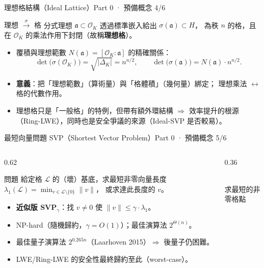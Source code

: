 \documentclass[aspectratio=169, 11pt]{beamer}
\newcommand{\OK}{\mathcal{O}_K}
\begin{document}
\begin{frame}{理想格結構（Ideal Lattice）}{Part 0 · 預備概念 4/6}
  \begin{block}{理想 $\xrightarrow{\ \sigma\ }$ 格}
    分式理想 $\mathfrak{a}\subset\OK$ 透過標準嵌入給出 $\sigma(\mathfrak{a})\subset H$，
    為秩 $n$ 的格，且在 $\OK$ 的乘法作用下封閉（故稱\textbf{理想格}）。
  \end{block}
  \begin{itemize}\small
    \item 覆積與理想範數 $N(\mathfrak{a})=[\OK:\mathfrak{a}]$ 的精確關係：
      \[
        \det\bigl(\sigma(\OK)\bigr)=\sqrt{|\Delta_K|}=n^{n/2},
        \qquad
        \det\bigl(\sigma(\mathfrak{a})\bigr)=N(\mathfrak{a})\cdot n^{n/2}.
      \]
    \item \textbf{意義}：把「理想範數」（算術量）與「格體積」（幾何量）綁定；
      理想乘法 $\leftrightarrow$ 格的代數作用。
    \item 理想格只是「一般格」的特例，但帶有額外環結構 $\Rightarrow$
      \alert{效率提升的根源}（Ring-LWE），同時也是\alert{安全爭議的來源}（Ideal-SVP 是否較易）。
  \end{itemize}
\end{frame}

\begin{frame}{最短向量問題 SVP（Shortest Vector Problem）}{Part 0 · 預備概念 5/6}
  \begin{columns}[T]
    \begin{column}{0.62\textwidth}
      \begin{block}{問題}
        給定格 $\mathcal{L}$ 的（壞）基底，求最短非零向量長度
        $\lambda_1(\mathcal{L})=\min_{v\in\mathcal{L}\setminus\{0\}}\|v\|$，
        或求達此長度的 $v$。
      \end{block}
      \begin{itemize}\small
        \item \textbf{近似版 SVP$_\gamma$}：找 $v\neq0$ 使 $\|v\|\le\gamma\cdot\lambda_1$。
        \item NP-hard（隨機歸約，$\gamma=O(1)$）；最佳演算法 $2^{\Theta(n)}$。
        \item 最佳量子演算法 $2^{0.265n}$（Laarhoven 2015）$\Rightarrow$ 後量子仍困難。
        \item LWE/Ring-LWE 的安全性最終歸約至此（worst-case）。
      \end{itemize}
    \end{column}
    \begin{column}{0.36\textwidth}
      \centering
      \\[2pt]{\scriptsize 求最短的非零格點}
    \end{column}
  \end{columns}
\end{frame}
\end{document}
